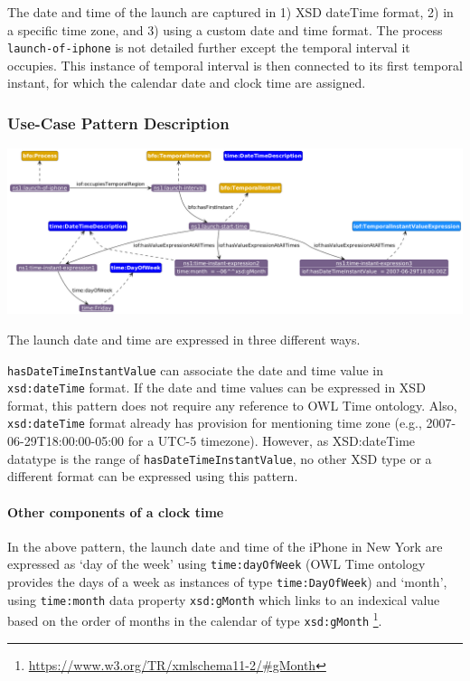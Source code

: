 The date and time of the launch are captured in 1) XSD dateTime format, 2) in a specific time zone, and 3) using a custom date and time format. The process \texttt{launch-of-iphone} is not detailed further except the temporal interval it occupies. This instance of temporal interval is then connected to its first temporal instant, for which the calendar date and clock time are assigned.   

\subsubsection*{Use-Case Pattern Description}

\includegraphics[scale=0.35]{scenarios/clock-time-calendar-date/images/uc1-dow-mn.png}

The launch date and time are expressed in three different ways.  

\texttt{hasDateTimeInstantValue} can associate the date and time value in \texttt{xsd:dateTime} format. If the date and time values can be expressed in XSD format, this pattern does not require any reference to OWL Time ontology. Also, \texttt{xsd:dateTime} format already has provision for mentioning time zone (e.g., 2007-06-29T18:00:00-05:00 for a UTC-5 timezone). However, as XSD:dateTime datatype is the range of \texttt{hasDateTimeInstantValue}, no other XSD type or a different format can be expressed using this pattern. 

\paragraph{Other components of a clock time \\}

In the above pattern, the launch date and time of the iPhone in New York are expressed as `day of the week' using \texttt{time:dayOfWeek} (OWL Time ontology provides the days of a week as instances of type \texttt{time:DayOfWeek})  and `month', using \texttt{time:month} data property \texttt{xsd:gMonth} which links to an indexical value based on the order of months in the calendar of type \texttt{xsd:gMonth} \footnote{\url{https://www.w3.org/TR/xmlschema11-2/\#gMonth}}. 

